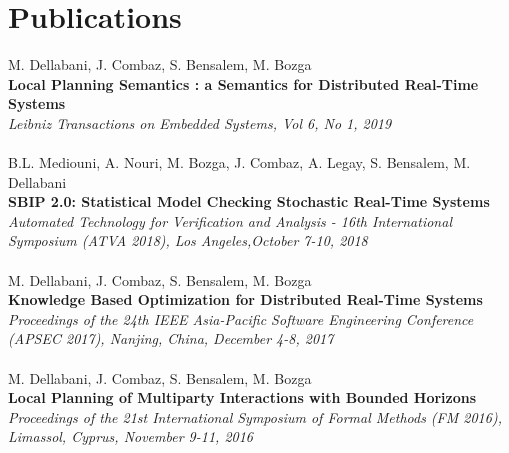 \documentclass[]{friggeri-cv}
\begin{document}
\section{Publications}
M. Dellabani, J. Combaz, S. Bensalem, M. Bozga\\
\textbf{Local Planning Semantics : a Semantics for Distributed Real-Time Systems}\\
\emph{Leibniz Transactions on Embedded Systems, Vol 6, No 1, 2019}
\\
\\
B.L. Mediouni, A. Nouri, M. Bozga, J. Combaz, A. Legay, S. Bensalem, M. Dellabani\\
\textbf{SBIP 2.0: Statistical Model Checking Stochastic Real-Time Systems}\\
\emph{Automated Technology for Verification and Analysis - 16th International Symposium (ATVA 2018), Los Angeles,October 7-10, 2018}
\\
\\
M. Dellabani, J. Combaz, S. Bensalem, M. Bozga\\
\textbf{Knowledge Based Optimization for Distributed Real-Time Systems}\\
\emph{Proceedings of the 24th IEEE Asia-Pacific Software Engineering Conference (APSEC 2017), Nanjing, China, December 4-8, 2017}
\\
\\
M. Dellabani, J. Combaz, S. Bensalem, M. Bozga\\
\textbf{Local Planning of Multiparty Interactions with Bounded Horizons}\\
\emph{Proceedings of the 21st International Symposium of Formal Methods (FM 2016), Limassol, Cyprus, November 9-11, 2016}
\end{document}
